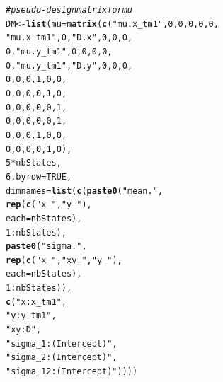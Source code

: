 \documentclass[12pt]{article}\usepackage[]{graphicx}\usepackage[]{xcolor}
\makeatletter
\newcommand{\hlnum}[1]{\textcolor[rgb]{0.686,0.059,0.569}{#1}}%
\newcommand{\hlstr}[1]{\textcolor[rgb]{0.192,0.494,0.8}{#1}}%
\newcommand{\hlcom}[1]{\textcolor[rgb]{0.678,0.584,0.686}{\textit{#1}}}%
\newcommand{\hlopt}[1]{\textcolor[rgb]{0,0,0}{#1}}%
\newcommand{\hlstd}[1]{\textcolor[rgb]{0.345,0.345,0.345}{#1}}%
\newcommand{\hlkwb}[1]{\textcolor[rgb]{0.69,0.353,0.396}{#1}}%
\newcommand{\hlkwc}[1]{\textcolor[rgb]{0.333,0.667,0.333}{#1}}%
\newcommand{\hlkwd}[1]{\textcolor[rgb]{0.737,0.353,0.396}{\textbf{#1}}}%
\newenvironment{kframe}{%
 \def\at@end@of@kframe{}%
 \ifinner\ifhmode%
  \def\at@end@of@kframe{\end{minipage}}%
  \begin{minipage}{\columnwidth}%
 \fi\fi%
 \def\FrameCommand##1{\hskip\@totalleftmargin \hskip-\fboxsep
 \colorbox{shadecolor}{##1}\hskip-\fboxsep
     \hskip-\linewidth \hskip-\@totalleftmargin \hskip\columnwidth}%
 \MakeFramed {\advance\hsize-\width
   \@totalleftmargin\z@ \linewidth\hsize
   \@setminipage}}%
 {\par\unskip\endMakeFramed%
 \at@end@of@kframe}
\newenvironment{knitrout}{}{} %
\makeatother
\begin{document}
\begin{knitrout}
\begin{kframe}
\begin{alltt}
\hlcom{# pseudo-design matrix for mu}
\hlstd{DM} \hlkwb{<-} \hlkwd{list}\hlstd{(}\hlkwc{mu}\hlstd{=}\hlkwd{matrix}\hlstd{(}\hlkwd{c}\hlstd{(}\hlstr{"mu.x_tm1"}\hlstd{,}         \hlnum{0}\hlstd{,}    \hlnum{0}\hlstd{,}\hlnum{0}\hlstd{,}\hlnum{0}\hlstd{,}\hlnum{0}\hlstd{,}
                       \hlstr{"mu.x_tm1"}\hlstd{,}         \hlnum{0}\hlstd{,}\hlstr{"D.x"}\hlstd{,}\hlnum{0}\hlstd{,}\hlnum{0}\hlstd{,}\hlnum{0}\hlstd{,}
                                \hlnum{0}\hlstd{,}\hlstr{"mu.y_tm1"}\hlstd{,}    \hlnum{0}\hlstd{,}\hlnum{0}\hlstd{,}\hlnum{0}\hlstd{,}\hlnum{0}\hlstd{,}
                                \hlnum{0}\hlstd{,}\hlstr{"mu.y_tm1"}\hlstd{,}\hlstr{"D.y"}\hlstd{,}\hlnum{0}\hlstd{,}\hlnum{0}\hlstd{,}\hlnum{0}\hlstd{,}
                                \hlnum{0}\hlstd{,}         \hlnum{0}\hlstd{,}    \hlnum{0}\hlstd{,}\hlnum{1}\hlstd{,}\hlnum{0}\hlstd{,}\hlnum{0}\hlstd{,}
                                \hlnum{0}\hlstd{,}         \hlnum{0}\hlstd{,}    \hlnum{0}\hlstd{,}\hlnum{0}\hlstd{,}\hlnum{1}\hlstd{,}\hlnum{0}\hlstd{,}
                                \hlnum{0}\hlstd{,}         \hlnum{0}\hlstd{,}    \hlnum{0}\hlstd{,}\hlnum{0}\hlstd{,}\hlnum{0}\hlstd{,}\hlnum{1}\hlstd{,}
                                \hlnum{0}\hlstd{,}         \hlnum{0}\hlstd{,}    \hlnum{0}\hlstd{,}\hlnum{0}\hlstd{,}\hlnum{0}\hlstd{,}\hlnum{1}\hlstd{,}
                                \hlnum{0}\hlstd{,}         \hlnum{0}\hlstd{,}    \hlnum{0}\hlstd{,}\hlnum{1}\hlstd{,}\hlnum{0}\hlstd{,}\hlnum{0}\hlstd{,}
                                \hlnum{0}\hlstd{,}         \hlnum{0}\hlstd{,}    \hlnum{0}\hlstd{,}\hlnum{0}\hlstd{,}\hlnum{1}\hlstd{,}\hlnum{0}\hlstd{),}
                     \hlnum{5}\hlopt{*}\hlstd{nbStates,}
                     \hlnum{6}\hlstd{,}\hlkwc{byrow}\hlstd{=}\hlnum{TRUE}\hlstd{,}
                     \hlkwc{dimnames}\hlstd{=}\hlkwd{list}\hlstd{(}\hlkwd{c}\hlstd{(}\hlkwd{paste0}\hlstd{(}\hlstr{"mean."}\hlstd{,}
                                            \hlkwd{rep}\hlstd{(}\hlkwd{c}\hlstd{(}\hlstr{"x_"}\hlstd{,}\hlstr{"y_"}\hlstd{),}
                                                \hlkwc{each}\hlstd{=nbStates),}
                                            \hlnum{1}\hlopt{:}\hlstd{nbStates),}
                                     \hlkwd{paste0}\hlstd{(}\hlstr{"sigma."}\hlstd{,}
                                            \hlkwd{rep}\hlstd{(}\hlkwd{c}\hlstd{(}\hlstr{"x_"}\hlstd{,}\hlstr{"xy_"}\hlstd{,}\hlstr{"y_"}\hlstd{),}
                                                \hlkwc{each}\hlstd{=nbStates),}
                                            \hlnum{1}\hlopt{:}\hlstd{nbStates)),}
                                   \hlkwd{c}\hlstd{(}\hlstr{"x:x_tm1"}\hlstd{,}
                                     \hlstr{"y:y_tm1"}\hlstd{,}
                                     \hlstr{"xy:D"}\hlstd{,}
                                     \hlstr{"sigma_1:(Intercept)"}\hlstd{,}
                                     \hlstr{"sigma_2:(Intercept)"}\hlstd{,}
                                     \hlstr{"sigma_12:(Intercept)"}\hlstd{))))}


\end{alltt}
\end{kframe}
\end{knitrout}
\end{document}
